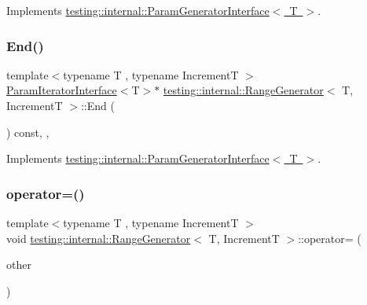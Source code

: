 Implements \mbox{\hyperlink{classtesting_1_1internal_1_1_param_generator_interface_afa7211b74990e11d3fc7ad4e7113da4f}{testing\+::internal\+::\+Param\+Generator\+Interface$<$ T $>$}}.

\mbox{\label{classtesting_1_1internal_1_1_range_generator_ac112ca69567b9c47bf14554e0473e1e2}} 
\subsubsection{\texorpdfstring{End()}{End()}\hspace{0.1cm}{\footnotesize\ttfamily [3/3]}}
{\footnotesize\ttfamily template$<$typename T , typename IncrementT $>$ \\
\mbox{\hyperlink{classtesting_1_1internal_1_1_param_iterator_interface}{Param\+Iterator\+Interface}}$<$T$>$$\ast$ \mbox{\hyperlink{classtesting_1_1internal_1_1_range_generator}{testing\+::internal\+::\+Range\+Generator}}$<$ T, IncrementT $>$\+::End (\begin{DoxyParamCaption}{ }\end{DoxyParamCaption}) const\hspace{0.3cm}{\ttfamily [inline]}, {\ttfamily [override]}, {\ttfamily [virtual]}}



Implements \mbox{\hyperlink{classtesting_1_1internal_1_1_param_generator_interface_afa7211b74990e11d3fc7ad4e7113da4f}{testing\+::internal\+::\+Param\+Generator\+Interface$<$ T $>$}}.

\mbox{\label{classtesting_1_1internal_1_1_range_generator_a00ef0f268e44d48d129a52bf0f9f9539}} 
\subsubsection{\texorpdfstring{operator=()}{operator=()}\hspace{0.1cm}{\footnotesize\ttfamily [1/3]}}
{\footnotesize\ttfamily template$<$typename T , typename IncrementT $>$ \\
void \mbox{\hyperlink{classtesting_1_1internal_1_1_range_generator}{testing\+::internal\+::\+Range\+Generator}}$<$ T, IncrementT $>$\+::operator= (\begin{DoxyParamCaption}\item[{const \mbox{\hyperlink{classtesting_1_1internal_1_1_range_generator}{Range\+Generator}}$<$ T, IncrementT $>$ \&}]{other }\end{DoxyParamCaption})\hspace{0.3cm}{\ttfamily [private]}}

